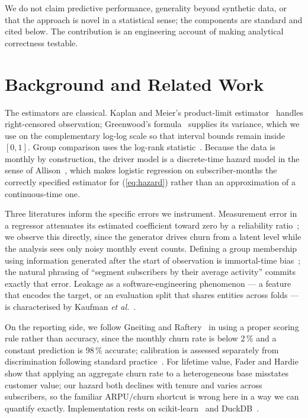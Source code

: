 \documentclass[conference]{IEEEtran}
\begin{document}
We do not claim predictive performance, generality beyond synthetic data, or
that the approach is novel in a statistical sense; the components are standard
and cited below. The contribution is an engineering account of making
analytical correctness testable.

\section{Background and Related Work}

The estimators are classical. Kaplan and Meier's product-limit
estimator~\cite{kaplan1958} handles right-censored observation; Greenwood's
formula~\cite{greenwood1926} supplies its variance, which we use on the
complementary log-log scale so that interval bounds remain inside $[0,1]$.
Group comparison uses the log-rank statistic~\cite{mantel1966}. Because the
data is monthly by construction, the driver model is a discrete-time hazard
model in the sense of Allison~\cite{allison1982}, which makes logistic
regression on subscriber-months the correctly specified estimator for
(\ref{eq:hazard}) rather than an approximation of a continuous-time one.

Three literatures inform the specific errors we instrument. Measurement error
in a regressor attenuates its estimated coefficient toward zero by a reliability
ratio~\cite{fuller1987}; we observe this directly, since the generator drives
churn from a latent level while the analysis sees only noisy monthly event
counts. Defining a group membership using information generated after the start
of observation is immortal-time bias~\cite{suissa2008}; the natural phrasing of
``segment subscribers by their average activity'' commits exactly that error.
Leakage as a software-engineering phenomenon --- a feature that encodes the
target, or an evaluation split that shares entities across folds --- is
characterised by Kaufman \emph{et al.}~\cite{kaufman2012}.

On the reporting side, we follow Gneiting and Raftery~\cite{gneiting2007} in
using a proper scoring rule rather than accuracy, since the monthly churn rate
is below 2\,\% and a constant prediction is 98\,\% accurate; calibration is
assessed separately from discrimination following standard
practice~\cite{harrell2015}. For lifetime value, Fader and
Hardie~\cite{fader2010} show that applying an aggregate churn rate to a
heterogeneous base misstates customer value; our hazard both declines with
tenure and varies across subscribers, so the familiar
$\mathrm{ARPU}/\mathrm{churn}$ shortcut is wrong here in a way we can quantify
exactly. Implementation rests on scikit-learn~\cite{pedregosa2011} and
DuckDB~\cite{raasveldt2019}.
\end{document}
